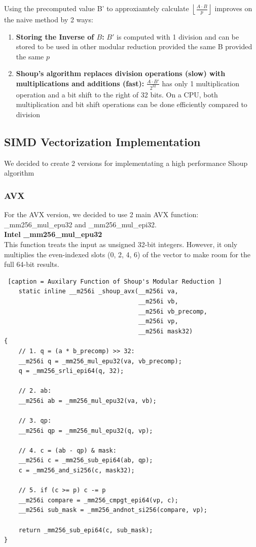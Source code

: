 \documentclass{article}
\begin{document}
Using the precomputed value B' to approxiamtely calculate $\left\lfloor \frac{A \cdot B}{p} \right\rfloor$ improves on the naive method by 2 ways:
\begin{enumerate}
    \item \textbf{Storing the Inverse of $B$:}
          $B'$ is computed with 1 division and can be stored to be used in other modular reduction provided the same B provided the same $p$
    \item \textbf{Shoup's algorithm replaces division operations (slow) with multiplications and additions (fast):}
          $\frac{A \cdot B'}{2^{32}}$ has only 1 multiplication operation and a bit shift to the right of 32 bits. On a CPU, both multiplication and bit shift operations can be done efficiently compared to division
\end{enumerate}
\subsection{SIMD Vectorization Implementation}
We decided to create 2 versions for implementating a high performance Shoup algorithm
\subsubsection{AVX}
For the AVX version, we decided to use 2 main AVX function:
\_mm256\_mul\_epu32 and \_mm256\_mul\_epi32. \\

\textbf{Intel \_mm256\_mul\_epu32}\\
This function treats the input as unsigned 32-bit integers. However, it only multiplies the even-indexed slots (0, 2, 4, 6) of the vector to make room for the full 64-bit results.
\begin{lstlisting} [caption = Auxilary Function of Shoup's Modular Reduction ]
    static inline __m256i _shoup_avx(__m256i va, 
                                     __m256i vb, 
                                     __m256i vb_precomp, 
                                     __m256i vp, 
                                     __m256i mask32)
{
    // 1. q = (a * b_precomp) >> 32:
    __m256i q = _mm256_mul_epu32(va, vb_precomp);
    q = _mm256_srli_epi64(q, 32);

    // 2. ab:
    __m256i ab = _mm256_mul_epu32(va, vb);

    // 3. qp:
    __m256i qp = _mm256_mul_epu32(q, vp);

    // 4. c = (ab - qp) & mask:
    __m256i c = _mm256_sub_epi64(ab, qp);
    c = _mm256_and_si256(c, mask32);

    // 5. if (c >= p) c -= p
    __m256i compare = _mm256_cmpgt_epi64(vp, c);
    __m256i sub_mask = _mm256_andnot_si256(compare, vp);

    return _mm256_sub_epi64(c, sub_mask);
}
\end{lstlisting}
\end{document}
